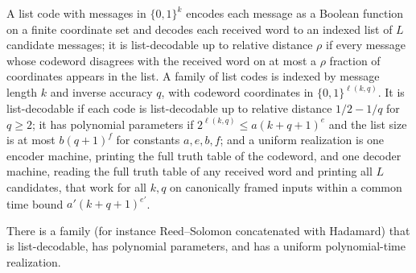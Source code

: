 \begin{definition}
  \label{def:meta-list-code-family}
  \leanok
  A list code with messages in $\{0,1\}^k$ encodes each message as a Boolean
  function on a finite coordinate set and decodes each received word to an
  indexed list of $L$ candidate messages; it is list-decodable up to relative
  distance $\rho$ if every message whose codeword disagrees with the received
  word on at most a $\rho$ fraction of coordinates appears in the list. A
  family of list codes is indexed by message length $k$ and inverse accuracy
  $q$, with codeword coordinates in $\{0,1\}^{\ell(k,q)}$. It is list-decodable
  if each code is list-decodable up to relative distance $1/2 - 1/q$ for
  $q \ge 2$; it has polynomial parameters if
  $2^{\ell(k,q)} \le a(k + q + 1)^e$ and the list size is at most
  $b(q+1)^f$ for constants $a, e, b, f$; and a uniform realization is one
  encoder machine, printing the full truth table of the codeword, and one
  decoder machine, reading the full truth table of any received word and
  printing all $L$ candidates, that work for all $k, q$ on canonically framed
  inputs within a common time bound $a'(k + q + 1)^{e'}$.
\end{definition}

\begin{theorem}
  \label{thm:meta-explicit-code-family}
  There is a family (for instance Reed--Solomon concatenated with Hadamard)
  that is list-decodable, has polynomial parameters, and has a uniform
  polynomial-time realization.
\end{theorem}
